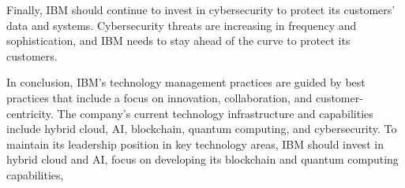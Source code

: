 Finally, IBM should continue to invest in cybersecurity to protect its customers' data and systems. Cybersecurity threats are increasing in frequency and sophistication, and IBM needs to stay ahead of the curve to protect its customers.

In conclusion, IBM's technology management practices are guided by best practices that include a focus on innovation, collaboration, and customer-centricity. The company's current technology infrastructure and capabilities include hybrid cloud, AI, blockchain, quantum computing, and cybersecurity. To maintain its leadership position in key technology areas, IBM should invest in hybrid cloud and AI, focus on developing its blockchain and quantum computing capabilities,

\newpage